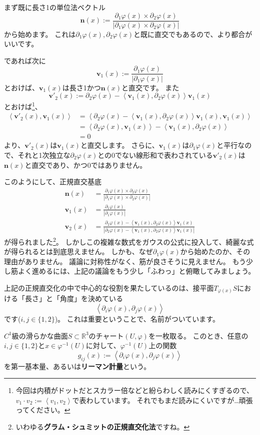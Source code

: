 まず既に長さ1の単位法ベクトル
\[
  \mathbf{n}(x):=\frac{\partial_1\varphi(x)\times\partial_2\varphi(x)}{|\partial_1\varphi(x)\times\partial_2\varphi(x)|}
\]
から始めます。
これは$\partial_1\varphi(x),\partial_2\varphi(x)$と既に直交でもあるので、より都合がいいです。

であれば次に
\[
  \mathbf{v}_1(x):=\frac{\partial_1\varphi(x)}{|\partial_1\varphi(x)|}
\]
とおけば、$\mathbf{v}_1(x)$は長さ1かつ$\mathbf{n}(x)$と直交です。
また
\[
  \mathbf{v}'_2(x):=\partial_2\varphi(x)-\left<\mathbf{v}_1(x), \partial_2\varphi(x)\right>\mathbf{v}_1(x)
\]
とおけば\footnote{
  今回は内積がドットだとスカラー倍などと紛らわしく読みにくすぎるので、$v_1\cdot v_2:=\left<v_1,v_2\right>$で表わしています。
  それでもまだ読みにくいですが…頑張ってください。
}、
\begin{align*}
  \left<\mathbf{v}'_2(x),\mathbf{v}_1(x)\right>&=\left<\partial_2\varphi(x)-\left<\mathbf{v}_1(x), \partial_2\varphi(x)\right>\mathbf{v}_1(x),\mathbf{v}_1(x)\right>\\
  &=\left<\partial_2\varphi(x),\mathbf{v}_1(x)\right>-\left<\mathbf{v}_1(x), \partial_2\varphi(x)\right>\\
  &=0
\end{align*}
より、$\mathbf{v}'_2(x)$は$\mathbf{v}_1(x)$と直交します。
さらに、$\mathbf{v}_1(x)$は$\partial_1\varphi(x)$と平行なので、それと1次独立な$\partial_2\varphi(x)$との0でない線形和で表わされている$\mathbf{v}'_2(x)$は$\mathbf{n}(x)$と直交であり、かつ0ではありません。

このようにして、正規直交基底
\begin{align*}
  \mathbf{n}(x)&=\frac{\partial_1\varphi(x)\times\partial_2\varphi(x)}{|\partial_1\varphi(x)\times\partial_2\varphi(x)|}\\
  \mathbf{v}_1(x)&=\frac{\partial_1\varphi(x)}{|\partial_1\varphi(x)|}\\
  \mathbf{v}_2(x)&=\frac{\partial_2\varphi(x)-\left<\mathbf{v}_1(x), \partial_2\varphi(x)\right>\mathbf{v}_1(x)}{|\partial_2\varphi(x)-\left<\mathbf{v}_1(x), \partial_2\varphi(x)\right>\mathbf{v}_1(x)|}
\end{align*}
が得られました\footnote{
  いわゆる\textbf{グラム・シュミットの正規直交化法}ですね。
}。
しかしこの複雑な数式をガウスの公式に投入して、綺麗な式が得られるとは到底思えません。
しかも、なぜ$\partial_1\varphi(x)$から始めたのか、その理由がありません。
議論に対称性がなく、筋が良さそうに見えません。
もう少し筋よく進めるには、上記の議論をもう少し「ふわっ」と俯瞰してみましょう。

上記の正規直交化の中で中心的な役割を果たしているのは、接平面$T_{\varphi(x)}S$における「長さ」と「角度」を決めている
\[
  \left<\partial_i\varphi(x),\partial_j\varphi(x)\right>
\]
です($i,j\in\{1,2\}$)。
これは重要ということで、名前がついています。
\begin{definition}
  $C^1$級の滑らかな曲面$S\subset\mathbb{R}^3$のチャート$(U,\varphi)$を一枚取る。
  このとき、任意の$i,j\in\{1,2\}$と$x\in\varphi^{-1}(U)$に対して、$\varphi^{-1}(U)$上の関数
  \[
    g_{ij}(x):=\left<\partial_i\varphi(x),\partial_j\varphi(x)\right>
  \]
  を第一基本量、あるいは\textbf{リーマン計量}という。
\end{definition}

